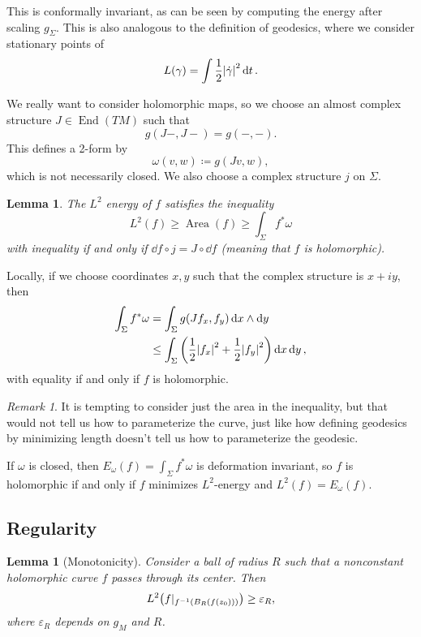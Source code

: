\documentclass[leqno, openany]{memoir}
\newtheorem{lem}[thm]{Lemma}
\theoremstyle{definition}
\theoremstyle{remark}
\newtheorem{rmk}[thm]{Remark}
\theoremstyle{plain}
\theoremstyle{definition}
\theoremstyle{remark}
\newcommand{\ep}{\varepsilon}
\newcommand{\on}[1]{\operatorname{#1}}
\DeclareMathOperator{\End}{End}
\begin{document}
This is conformally invariant, as can be seen by computing the energy after scaling $g_{\Sigma}$. This is also analogous to the definition of geodesics, where we consider stationary points of
\[ L(\gamma) = \int \frac{1}{2} \abs{\dot{\gamma}}^2 \dd{t}. \]

We really want to consider holomorphic maps, so we choose an almost complex structure $J \in \End(TM)$ such that
\[ g(J-, J-) = g(-,-). \]
This defines a 2-form by
\[ \omega(v,w) \coloneqq g(Jv, w), \]
which is not necessarily closed. We also choose a complex structure $j$ on $\Sigma$.

\begin{lem}
    The $L^2$ energy of $f$ satisfies the inequality
    \[ L^2(f) \geq \on{Area}(f) \geq \int_{\Sigma} f^* \omega \]
    with inequality if and only if $\dd{f} \circ j = J \circ \dd{f}$ (meaning that $f$ is holomorphic).
\end{lem}

Locally, if we choose coordinates $x,y$ such that the complex structure is $x+iy$, then
\begin{align*} 
    \int_{\Sigma} f^* \omega &= \int_{\Sigma} g(J f_x, f_y) \dd{x} \wedge \dd{y} \\
    &\leq \int_{\Sigma} \qty(\frac{1}{2} \abs{f_x}^2 + \frac{1}{2} \abs{f_y}^2) \dd{x} \dd{y},
\end{align*}
with equality if and only if $f$ is holomorphic.

\begin{rmk}
    It is tempting to consider just the area in the inequality, but that would not tell us how to parameterize the curve, just like how defining geodesics by minimizing length doesn't tell us how to parameterize the geodesic.
\end{rmk}

If $\omega$ is closed, then $E_{\omega}(f) = \int_{\Sigma} f^*\omega$ is deformation invariant, so $f$ is holomorphic if and only if $f$ minimizes $L^2$-energy and $L^2(f) = E_{\omega}(f)$.

\subsection{Regularity}


\begin{lem}[Monotonicity]
    Consider a ball of radius $R$ such that a nonconstant holomorphic curve $f$ passes through its center. Then
    \[ L^2\qty(f|_{f^{-1}(B_R(f(z_0)))}) \geq \ep_R, \]
    where $\ep_R$ depends on $g_M$ and $R$.
\end{lem}
\end{document}
